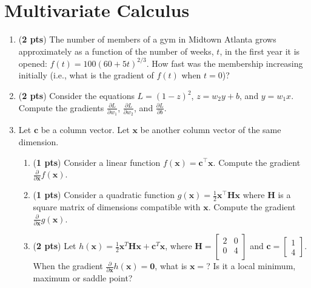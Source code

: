 \documentclass[11pt, letterpaper]{article}
\begin{document}
\section{Multivariate Calculus}
\begin{enumerate}[label=(\alph*)]
	\item (\textbf{2 pts}) The number of members of a gym in  Midtown Atlanta grows approximately as a function of the number of weeks, $t$, in the first year it is opened: $f(t) = 100 (60 + 5t)^{2/3}$. How fast was the membership increasing initially (i.e., what is the gradient of $f(t)$ when $t=0$)?
	
    \item (\textbf{2 pts}) Consider the equations $L = (1 - z)^2$, $z = w_2y + b$, and $y = w_1x$.\\Compute the gradients $\frac{\partial L}{\partial w_1}$, $\frac{\partial L}{\partial w_2}$, and $\frac{\partial L}{\partial b}$.


	\item Let $\mathbf{c}$ be a column vector. Let $\mathbf{x}$ be another column vector of the same dimension. 


    \begin{enumerate}[label=(\roman*)]
	   \item (\textbf{1 pts}) Consider a linear function $f(\mathbf{x})=\mathbf{c}^\top\mathbf{x}$. Compute the gradient $\frac{\partial}{\partial\mathbf{x}}f(\mathbf{x})$.
	   \item (\textbf{1 pts}) Consider a quadratic function $g(\mathbf{x})=\frac{1}{2}\mathbf{x}^\top\mathbf{H}\mathbf{x}$ where $\mathbf{H}$ is a square matrix of dimensions compatible with $\mathbf{x}$. Compute the gradient $\frac{\partial}{\partial\mathbf{x}}g(\mathbf{x})$.
	   \item (\textbf{2 pts}) Let
	   $h(\mathbf{x})=\frac{1}{2}\mathbf{x}^T\mathbf{H}\mathbf{x}+\mathbf{c}^T\mathbf{x}$, where $\mathbf{H} = \begin{bmatrix} 
                2 & 0\\
                0 & 4\\
           \end{bmatrix}$ and $\mathbf{c} = \begin{bmatrix} 1 \\ 4\end{bmatrix}$. When the gradient $\frac{\partial}{\partial\mathbf{x}}h(\mathbf{x}) = \mathbf{0}$, what is $\mathbf{x} =$? Is it a local minimum, maximum or saddle point? 
    \end{enumerate}
    
\end{enumerate}
\end{document}

